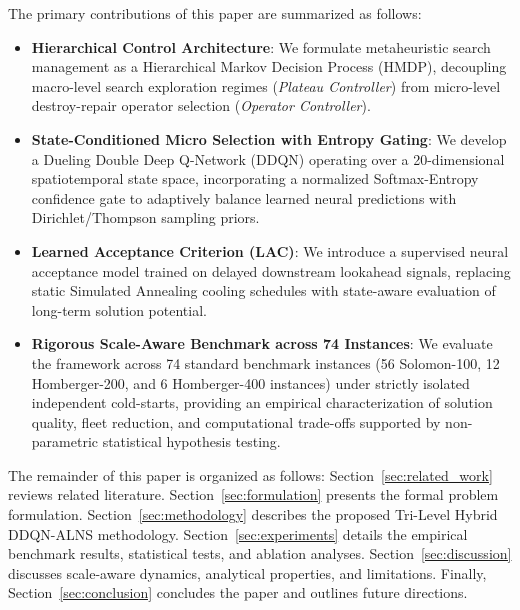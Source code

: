 The primary contributions of this paper are summarized as follows:
\begin{itemize}
    \item \textbf{Hierarchical Control Architecture}: We formulate metaheuristic search management as a Hierarchical Markov Decision Process (HMDP), decoupling macro-level search exploration regimes (\emph{Plateau Controller}) from micro-level destroy-repair operator selection (\emph{Operator Controller}).
    \item \textbf{State-Conditioned Micro Selection with Entropy Gating}: We develop a Dueling Double Deep Q-Network (DDQN) operating over a 20-dimensional spatiotemporal state space, incorporating a normalized Softmax-Entropy confidence gate to adaptively balance learned neural predictions with Dirichlet/Thompson sampling priors.
    \item \textbf{Learned Acceptance Criterion (LAC)}: We introduce a supervised neural acceptance model trained on delayed downstream lookahead signals, replacing static Simulated Annealing cooling schedules with state-aware evaluation of long-term solution potential.
    \item \textbf{Rigorous Scale-Aware Benchmark across 74 Instances}: We evaluate the framework across 74 standard benchmark instances (56 Solomon-100, 12 Homberger-200, and 6 Homberger-400 instances) under strictly isolated independent cold-starts, providing an empirical characterization of solution quality, fleet reduction, and computational trade-offs supported by non-parametric statistical hypothesis testing.
\end{itemize}

The remainder of this paper is organized as follows: Section~\ref{sec:related_work} reviews related literature. Section~\ref{sec:formulation} presents the formal problem formulation. Section~\ref{sec:methodology} describes the proposed Tri-Level Hybrid DDQN-ALNS methodology. Section~\ref{sec:experiments} details the empirical benchmark results, statistical tests, and ablation analyses. Section~\ref{sec:discussion} discusses scale-aware dynamics, analytical properties, and limitations. Finally, Section~\ref{sec:conclusion} concludes the paper and outlines future directions.
